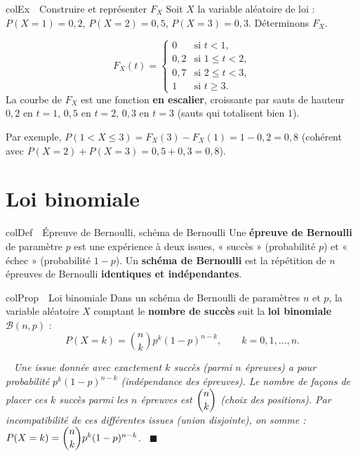 \documentclass[11pt,a4paper]{article}
\newenvironment{definition}[1][Définition]
  {\begin{fiche}{colDef}{\ding{110}~~#1}}{\end{fiche}}
\newenvironment{propriete}[1][Propriété]
  {\begin{fiche}{colProp}{\ding{72}~~#1}}{\end{fiche}}
\newenvironment{exemple}[1][Exemple]
  {\begin{fiche}{colEx}{\ding{217}~~#1}}{\end{fiche}}
\newenvironment{demo}
  {\par\smallskip\noindent{\sffamily\bfseries\color{qtealdark}Démonstration.}\ \itshape}
  {\ \normalfont\hfill$\blacksquare$\par\medskip}
\begin{document}
\begin{exemple}[Construire et représenter $F_X$]
Soit $X$ la variable aléatoire de loi : $P(X=1)=0{,}2$, $P(X=2)=0{,}5$, $P(X=3)=0{,}3$. Déterminons $F_X$.

\smallskip
\[
  F_X(t) =
  \begin{cases}
    0 & \text{si } t<1,\\
    0{,}2 & \text{si } 1\leq t<2,\\
    0{,}7 & \text{si } 2\leq t<3,\\
    1 & \text{si } t\geq3.
  \end{cases}
\]
La courbe de $F_X$ est une fonction \textbf{en escalier}, croissante par sauts de hauteur $0{,}2$ en $t=1$, $0{,}5$ en $t=2$, $0{,}3$ en $t=3$ (sauts qui totalisent bien $1$).

\smallskip
Par exemple, $P(1<X\leq3)=F_X(3)-F_X(1)=1-0{,}2=0{,}8$ (cohérent avec $P(X=2)+P(X=3)=0{,}5+0{,}3=0{,}8$).
\end{exemple}

\section{Loi binomiale}

\begin{definition}[Épreuve de Bernoulli, schéma de Bernoulli]
Une \textbf{épreuve de Bernoulli} de paramètre $p$ est une expérience à deux issues, « succès » (probabilité $p$) et « échec » (probabilité $1-p$). Un \textbf{schéma de Bernoulli} est la répétition de $n$ épreuves de Bernoulli \textbf{identiques et indépendantes}.
\end{definition}

\begin{propriete}[Loi binomiale]
Dans un schéma de Bernoulli de paramètres $n$ et $p$, la variable aléatoire $X$ comptant le \textbf{nombre de succès} suit la \textbf{loi binomiale} $\mathcal{B}(n,p)$ :
\[
  P(X=k) = \binom nk p^k(1-p)^{n-k}, \qquad k=0,1,\ldots,n.
\]
\end{propriete}

\begin{demo}
Une issue donnée avec exactement $k$ succès (parmi $n$ épreuves) a pour probabilité $p^k(1-p)^{n-k}$ (indépendance des épreuves). Le nombre de façons de placer ces $k$ succès parmi les $n$ épreuves est $\dbinom nk$ (choix des positions). Par incompatibilité de ces différentes issues (union disjointe), on somme : $P(X=k)=\dbinom nkp^k(1-p)^{n-k}$.
\end{demo}
\end{document}
